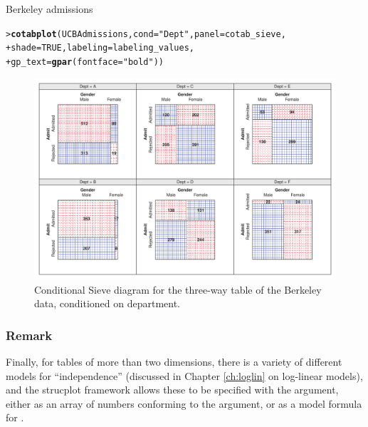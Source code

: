 \documentclass[10pt,krantz2]{krantz}\usepackage[]{graphicx}\usepackage[]{color}
\makeatletter
\newcommand{\hlnum}[1]{\textcolor[rgb]{0.686,0.059,0.569}{#1}}%
\newcommand{\hlstr}[1]{\textcolor[rgb]{0.192,0.494,0.8}{#1}}%
\newcommand{\hlstd}[1]{\textcolor[rgb]{0.345,0.345,0.345}{#1}}%
\newcommand{\hlkwc}[1]{\textcolor[rgb]{0.333,0.667,0.333}{#1}}%
\newcommand{\hlkwd}[1]{\textcolor[rgb]{0.737,0.353,0.396}{\textbf{#1}}}%
\newenvironment{kframe}{%
 \def\at@end@of@kframe{}%
 \ifinner\ifhmode%
  \def\at@end@of@kframe{\end{minipage}}%
  \begin{minipage}{\columnwidth}%
 \fi\fi%
 \def\FrameCommand##1{\hskip\@totalleftmargin \hskip-\fboxsep
 \colorbox{shadecolor}{##1}\hskip-\fboxsep
     \hskip-\linewidth \hskip-\@totalleftmargin \hskip\columnwidth}%
 \MakeFramed {\advance\hsize-\width
   \@totalleftmargin\z@ \linewidth\hsize
   \@setminipage}}%
 {\par\unskip\endMakeFramed%
 \at@end@of@kframe}
\newenvironment{knitrout}{}{} %
\renewenvironment{knitrout}{\small\renewcommand{\baselinestretch}{.85}}{} %
\makeatother
\begin{document}
\begin{Example}[berkeley3]{Berkeley admissions}
\begin{knitrout}
\end{knitrout}
\begin{knitrout}
\color{fgcolor}\begin{kframe}
\begin{alltt}
\hlstd{> }\hlkwd{cotabplot}\hlstd{(UCBAdmissions,} \hlkwc{cond} \hlstd{=} \hlstr{"Dept"}\hlstd{,} \hlkwc{panel} \hlstd{= cotab_sieve,}
\hlstd{+ }          \hlkwc{shade} \hlstd{=} \hlnum{TRUE}\hlstd{,} \hlkwc{labeling} \hlstd{= labeling_values,}
\hlstd{+ }          \hlkwc{gp_text} \hlstd{=} \hlkwd{gpar}\hlstd{(}\hlkwc{fontface} \hlstd{=} \hlstr{"bold"}\hlstd{))}
\end{alltt}
\end{kframe}\begin{figure}[!htbp]

\centerline{\includegraphics[width=\textwidth]{ch04/fig/berkeley-cotabsieve2-1} }

\caption[Conditional Sieve diagram for the three-way table of the Berkeley data, conditioned on department]{Conditional Sieve diagram for the three-way table of the Berkeley data, conditioned on department.}\label{fig:berkeley-cotabsieve2}
\end{figure}


\end{knitrout}

\subsubsection*{Remark}

Finally, for tables of more than two dimensions, there is a variety of
different models for ``independence'' (discussed in Chapter \ref{ch:loglin}
on log-linear models), and the strucplot framework
allows these to be specified with the  argument,
either as an array of numbers conforming to the 
argument, or as a model formula for .


\end{Example}
\end{document}
